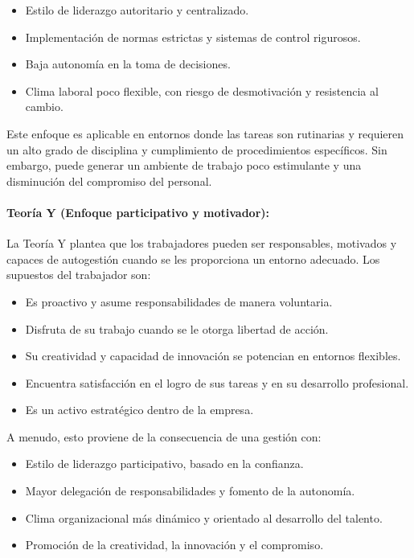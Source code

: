 \documentclass[a4paper,oneside,11pt]{article}
\begin{document}
\begin{itemize}
    \item Estilo de liderazgo autoritario y centralizado.
    \item Implementación de normas estrictas y sistemas de control rigurosos.
    \item Baja autonomía en la toma de decisiones.
    \item Clima laboral poco flexible, con riesgo de desmotivación y resistencia al cambio.
\end{itemize}

Este enfoque es aplicable en entornos donde las tareas son rutinarias y requieren un alto grado de disciplina y cumplimiento de procedimientos específicos. Sin embargo, puede generar un ambiente de trabajo poco estimulante y una disminución del compromiso del personal.


\paragraph{\textbf{Teoría Y (Enfoque participativo y motivador):}}

La Teoría Y plantea que los trabajadores pueden ser responsables, motivados y capaces de autogestión cuando se les proporciona un entorno adecuado. Los supuestos del trabajador son:


\begin{itemize}
    \item Es proactivo y asume responsabilidades de manera voluntaria.
    \item Disfruta de su trabajo cuando se le otorga libertad de acción.
    \item Su creatividad y capacidad de innovación se potencian en entornos flexibles.
    \item Encuentra satisfacción en el logro de sus tareas y en su desarrollo profesional.
    \item Es un activo estratégico dentro de la empresa.
\end{itemize}

A menudo, esto proviene de la consecuencia de una gestión con:


\begin{itemize}
    \item Estilo de liderazgo participativo, basado en la confianza.
    \item Mayor delegación de responsabilidades y fomento de la autonomía.
    \item Clima organizacional más dinámico y orientado al desarrollo del talento.
    \item Promoción de la creatividad, la innovación y el compromiso.
\end{itemize}
\end{document}
